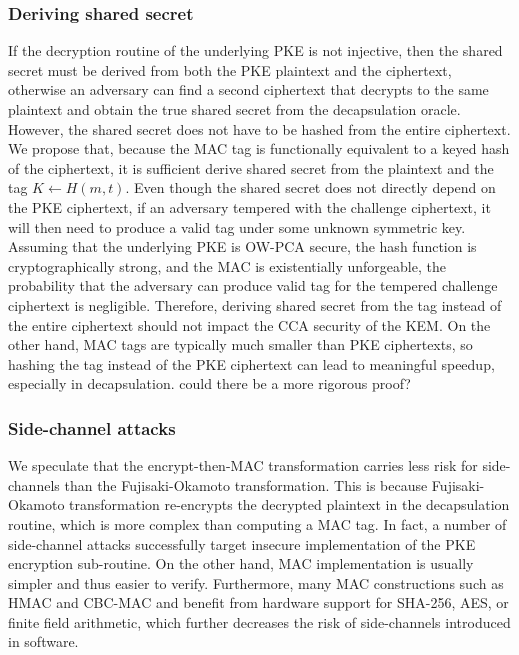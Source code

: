 \documentclass[runningheads]{llncs}
\begin{document}
\subsubsection{Deriving shared secret} If the decryption routine of the underlying PKE is not injective, then the shared secret must be derived from both the PKE plaintext and the ciphertext, otherwise an adversary can find a second ciphertext that decrypts to the same plaintext and obtain the true shared secret from the decapsulation oracle. However, the shared secret does not have to be hashed from the entire ciphertext. We propose that, because the MAC tag is functionally equivalent to a keyed hash of the ciphertext, it is sufficient derive shared secret from the plaintext and the tag $K \leftarrow H(m, t)$. Even though the shared secret does not directly depend on the PKE ciphertext, if an adversary tempered with the challenge ciphertext, it will then need to produce a valid tag under some unknown symmetric key. Assuming that the underlying PKE is OW-PCA secure, the hash function is cryptographically strong, and the MAC is existentially unforgeable, the probability that the adversary can produce valid tag for the tempered challenge ciphertext is negligible. Therefore, deriving shared secret from the tag instead of the entire ciphertext should not impact the CCA security of the KEM. On the other hand, MAC tags are typically much smaller than PKE ciphertexts, so hashing the tag instead of the PKE ciphertext can lead to meaningful speedup, especially in decapsulation. {\color{red} could there be a more rigorous proof?}

\subsubsection{Side-channel attacks} We speculate that the encrypt-then-MAC transformation carries less risk for side-channels than the Fujisaki-Okamoto transformation. This is because Fujisaki-Okamoto transformation re-encrypts the decrypted plaintext in the decapsulation routine, which is more complex than computing a MAC tag. In fact, a number of side-channel attacks \cite{cryptoeprint:2024/1049,cryptoeprint:2024/2051,clangover} successfully target insecure implementation of the PKE encryption sub-routine. On the other hand, MAC implementation is usually simpler and thus easier to verify. Furthermore, many MAC constructions such as HMAC and CBC-MAC and benefit from hardware support for SHA-256, AES, or finite field arithmetic, which further decreases the risk of side-channels introduced in software.
\end{document}
